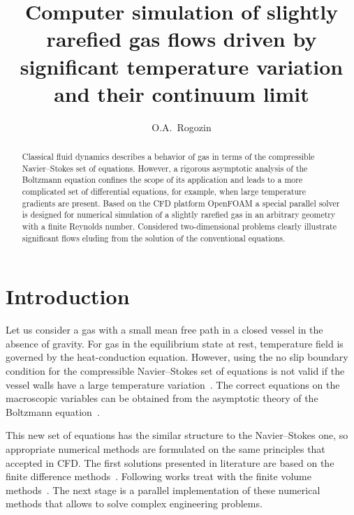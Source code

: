 \documentclass[smallextended, referee]{svjour3} %
\begin{document}
\title{
	Computer simulation of slightly rarefied gas flows driven by significant temperature variation and their continuum limit
}

\author{O.A.~Rogozin}

\maketitle

\begin{abstract}
	Classical fluid dynamics describes a behavior of gas in terms of the compressible Navier--Stokes
	set of equations. However, a rigorous asymptotic analysis of the Boltzmann equation confines
	the scope of its application and leads to a more complicated set of differential equations,
	for example, when large temperature gradients are present. Based on the CFD platform
	OpenFOAM\textregistered{} a special parallel solver is designed for numerical simulation of a slightly rarefied gas
	in an arbitrary geometry with a finite Reynolds number. Considered two-dimensional problems
	clearly illustrate significant flows eluding from the solution of the conventional equations.
\end{abstract}

\section{Introduction}

Let us consider a gas with a small mean free path in a closed vessel in the absence of gravity.
For gas in the equilibrium state at rest, temperature field is governed by the heat-conduction equation.
However, using the no slip boundary condition for the compressible Navier--Stokes set of equations
is not valid if the vessel walls have a large temperature variation~\cite{Kogan1976, GhostEffect}.
The correct equations on the macroscopic variables can be obtained from the asymptotic theory of
the Boltzmann equation~\cite{Sone2002, Sone2007}.

This new set of equations has the similar structure to the Navier--Stokes one,
so appropriate numerical methods are formulated on the same principles that accepted in CFD.
The first solutions presented in literature are based on the finite difference methods~\cite{GhostEffect, SoneCoaxial}.
Following works treat with the finite volume methods~\cite{Laneryd2006, Laneryd2007}.
The next stage is a parallel implementation of these numerical methods that allows
to solve complex engineering problems.
\end{document}
